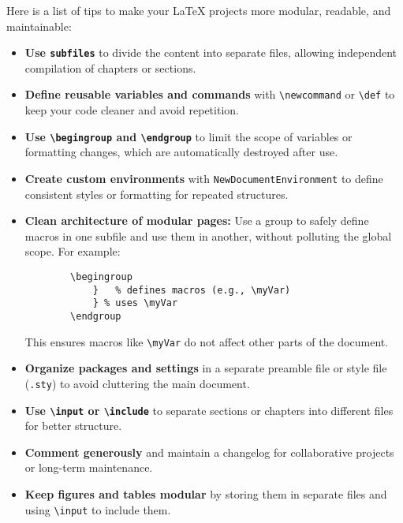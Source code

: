 \documentclass[../../main.tex]{subfiles}
\begin{document}
Here is a list of tips to make your LaTeX projects more modular, readable, and maintainable:

\begin{itemize}
    \item \textbf{Use \texttt{subfiles}} to divide the content into separate files, allowing independent compilation of chapters or sections.
    
    \item \textbf{Define reusable variables and commands} with \texttt{\textbackslash newcommand} or \texttt{\textbackslash def} to keep your code cleaner and avoid repetition.
    
    \item \textbf{Use \texttt{\textbackslash begingroup} and \texttt{\textbackslash endgroup}} to limit the scope of variables or formatting changes, which are automatically destroyed after use.
    
    \item \textbf{Create custom environments} with \texttt{NewDocumentEnvironment} to define consistent styles or formatting for repeated structures.
    
    \item \textbf{Clean architecture of modular pages:} Use a group to safely define macros in one subfile and use them in another, without polluting the global scope. For example:
    \begin{verbatim}
        \begingroup
            }   % defines macros (e.g., \myVar)
            } % uses \myVar
        \endgroup
    \end{verbatim}
    This ensures macros like \texttt{\textbackslash myVar} do not affect other parts of the document.

    \item \textbf{Organize packages and settings} in a separate preamble file or style file (\texttt{.sty}) to avoid cluttering the main document.
    
    \item \textbf{Use \texttt{\textbackslash input} or \texttt{\textbackslash include}} to separate sections or chapters into different files for better structure.
    
    \item \textbf{Comment generously} and maintain a changelog for collaborative projects or long-term maintenance.
    
    \item \textbf{Keep figures and tables modular} by storing them in separate files and using \texttt{\textbackslash input} to include them.
    

\end{itemize}
\end{document}
